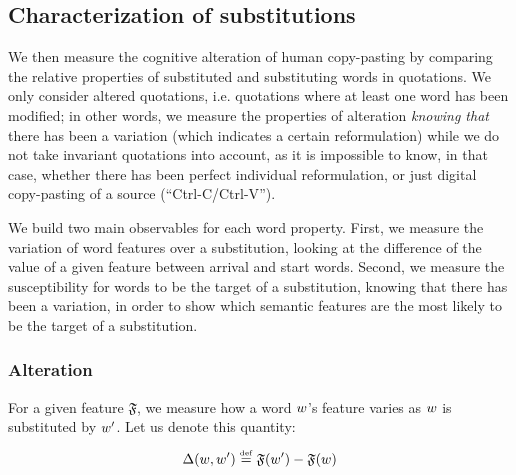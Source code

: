 \subsection{Characterization of substitutions}

We then measure the cognitive alteration of human copy-pasting by comparing the relative properties of substituted and substituting words in quotations.  We only consider altered quotations, \hbox{i.e.} quotations where at least one word has been modified; in other words, we measure the properties of alteration \emph{knowing that} there has been a variation (which indicates a certain reformulation) while we do not take invariant quotations into account, as it is impossible to know, in that case, whether there has been perfect individual reformulation, or just digital copy-pasting of a source (``{\sf Ctrl-C}/{\sf Ctrl-V}'').

We build two main observables for each word property. First, we measure the variation of word features over a substitution, looking at the difference of the value of a given feature between arrival and start words. %
Second, we measure the susceptibility for words to be the target of a substitution, knowing that there has been a variation, in order to show which semantic features are the most likely to be the target of a substitution. %

\subsubsection{Alteration}
For a given feature $\mathfrak{F}$, we measure how a word $w$'s feature varies as $w$ is substituted by $w'$. Let us denote this quantity:
$$\Delta (w,w') \overset{\underset{\mathrm{def}}{}}{=} \mathfrak{F}(w') - \mathfrak{F}(w)$$

